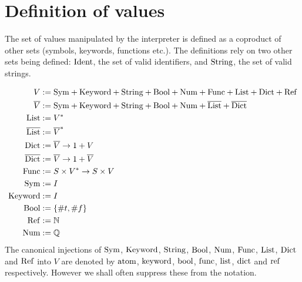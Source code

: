 \section{Definition of \rad{} values}
\label{value-definition}

The set of values manipulated by the \rad{} interpreter is defined as a coproduct
of other sets (symbols, keywords, functions etc.). The definitions rely on two
other sets being defined: $\mathrm{Ident}$, the set of valid identifiers, and $\mathrm{String}$,
the set of valid strings. 

\begin{align*}
  V &:= \mathrm{Sym} + \mathrm{Keyword} + \mathrm{String} + \mathrm{Bool} + \mathrm{Num} + \mathrm{Func} + \mathrm{List} + \mathrm{Dict} + \mathrm{Ref}\\
  \overline{V} &:= \mathrm{Sym} + \mathrm{Keyword} + \mathrm{String} + \mathrm{Bool} + \mathrm{Num} + \overline{\mathrm{List}} + \overline{\mathrm{Dict}}\\
  \mathrm{List} &:= V^*\\
  \overline{\mathrm{List}} &:= \overline{V}^*\\
  \mathrm{Dict} &:= \overline{V} \to 1 + V\\
  \overline{\mathrm{Dict}} &:= \overline{V} \to 1 + \overline{V}\\
  \mathrm{Func} &:= S \times V^* \to S \times V\\
  \mathrm{Sym} &:= I\\
  \mathrm{Keyword} &:= I\\
  \mathrm{Bool} &:= \{\#t, \#f\}\\
  \mathrm{Ref} &:= \mathbb{N}\\
  \mathrm{Num} &:= \mathbb{Q}
\end{align*}
The canonical injections of $\mathrm{Sym}$, $\mathrm{Keyword}$, $\mathrm{String}$, $\mathrm{Bool}$, $\mathrm{Num}$, $\mathrm{Func}$, $\mathrm{List}$,
$\mathrm{Dict}$ and $\mathrm{Ref}$ into $V$ are denoted by $\mathrm{atom}$, $\mathrm{keyword}$, $\mathrm{bool}$, $\mathrm{func}$,
$\mathrm{list}$, $\mathrm{dict}$ and $\mathrm{ref}$ respectively. However we shall often suppress these
from the notation.
